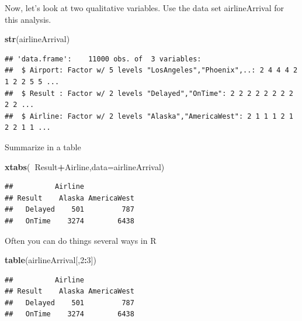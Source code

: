 \documentclass[]{book}
\newenvironment{Shaded}{\begin{snugshade}}{\end{snugshade}}
\newcommand{\KeywordTok}[1]{\textcolor[rgb]{0.13,0.29,0.53}{\textbf{#1}}}
\newcommand{\DataTypeTok}[1]{\textcolor[rgb]{0.13,0.29,0.53}{#1}}
\newcommand{\DecValTok}[1]{\textcolor[rgb]{0.00,0.00,0.81}{#1}}
\newcommand{\OperatorTok}[1]{\textcolor[rgb]{0.81,0.36,0.00}{\textbf{#1}}}
\newcommand{\NormalTok}[1]{#1}
\theoremstyle{definition}
\theoremstyle{definition}
\theoremstyle{definition}
\theoremstyle{remark}
\begin{document}
Now, let's look at two qualitative variables. Use the data set
airlineArrival for this analysis.

\begin{Shaded}
\begin{Highlighting}[]
\KeywordTok{str}\NormalTok{(airlineArrival)}
\end{Highlighting}
\end{Shaded}

\begin{verbatim}
## 'data.frame':    11000 obs. of  3 variables:
##  $ Airport: Factor w/ 5 levels "LosAngeles","Phoenix",..: 2 4 4 4 2 1 2 2 5 5 ...
##  $ Result : Factor w/ 2 levels "Delayed","OnTime": 2 2 2 2 2 2 2 2 2 2 ...
##  $ Airline: Factor w/ 2 levels "Alaska","AmericaWest": 2 1 1 1 2 1 2 2 1 1 ...
\end{verbatim}

Summarize in a table

\begin{Shaded}
\begin{Highlighting}[]
\KeywordTok{xtabs}\NormalTok{(}\OperatorTok{~}\NormalTok{Result}\OperatorTok{+}\NormalTok{Airline,}\DataTypeTok{data=}\NormalTok{airlineArrival)}
\end{Highlighting}
\end{Shaded}

\begin{verbatim}
##          Airline
## Result    Alaska AmericaWest
##   Delayed    501         787
##   OnTime    3274        6438
\end{verbatim}

Often you can do things several ways in R

\begin{Shaded}
\begin{Highlighting}[]
\KeywordTok{table}\NormalTok{(airlineArrival[,}\DecValTok{2}\OperatorTok{:}\DecValTok{3}\NormalTok{])}
\end{Highlighting}
\end{Shaded}

\begin{verbatim}
##          Airline
## Result    Alaska AmericaWest
##   Delayed    501         787
##   OnTime    3274        6438
\end{verbatim}

\begin{Shaded}
\end{Shaded}
\end{document}
